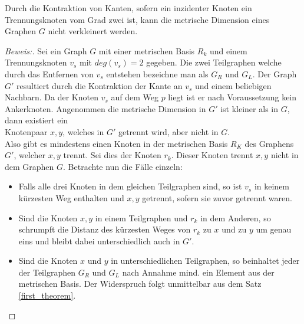 \begin{lem}
\label{sepvertex2}
Durch die Kontraktion von Kanten, sofern ein inzidenter Knoten ein Trennungsknoten vom Grad zwei ist, kann die metrische Dimension eines Graphen $G$ nicht verkleinert werden.
\end{lem}
\begin{proof}[Beweis:]
Sei ein Graph $G$ mit einer metrischen Basis $R_k$ und einem Trennungsknoten $v_s$ mit $deg(v_s)=2$ gegeben. Die zwei Teilgraphen welche durch das Entfernen von $v_s$ entstehen bezeichne man als $G_R$ und $G_L$.
Der Graph $G'$ resultiert durch die Kontraktion der Kante an $v_s$ und einem beliebigen Nachbarn. Da der Knoten $v_s$ auf dem Weg $p$ liegt ist er nach Voraussetzung kein Ankerknoten.\newline
Angenommen die metrische Dimension in $G'$ ist kleiner als in $G$, dann existiert ein\\Knotenpaar $x,y$, welches in $G'$ getrennt wird, aber nicht in $G$.\\Also gibt es mindestens einen Knoten in der metrischen Basis $R_K$ des Graphens $G'$, welcher $x,y$ trennt. Sei dies der Knoten $r_k$. Dieser Knoten trennt $x,y$ nicht in dem Graphen $G$. 
Betrachte nun die Fälle einzeln:
\begin{itemize}
\item Falls alle drei Knoten in dem gleichen Teilgraphen sind, so ist $v_s$ in keinem kürzesten Weg enthalten und $x,y$ getrennt, sofern sie zuvor getrennt waren.
\item Sind die Knoten $x,y$ in einem Teilgraphen und $r_k$ in dem Anderen, so schrumpft die Distanz des kürzesten Weges von $r_k$ zu $x$ und zu $y$ um genau eins und bleibt dabei unterschiedlich auch in $G'$.
\item Sind die Knoten $x$ und $y$ in unterschiedlichen Teilgraphen, so beinhaltet jeder der Teilgraphen $G_R$ und $G_L$ nach Annahme mind. ein Element aus der metrischen Basis. Der Widerspruch folgt unmittelbar aus dem Satz \ref{first_theorem}.
\vspace{-5mm}
\end{itemize}
\end{proof}
